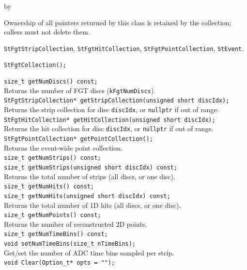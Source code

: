 \documentclass[twoside]{article}
\newcommand{\entrylabel}[1]{\mbox{\textbf{{#1}}}\hfil}%
\newenvironment{entry}
{\begin{list}{}%
    {\renewcommand{\makelabel}{\entrylabel}%
     \setlength{\labelwidth}{90pt}%
     \setlength{\leftmargin}{\labelwidth}
     \advance\leftmargin by \labelsep%
      }%
    }%
  {\end{list}}
\newcommand{\Entrylabel}[1]%
{\raisebox{0pt}[1ex][0pt]{\makebox[\labelwidth][l]%
    {\parbox[t]{\labelwidth}{\hspace{0pt}\textbf{{#1}}}}}}
\newenvironment{Entry}%
{\renewcommand{\entrylabel}{\Entrylabel}\begin{entry}}%
  {\end{entry}}
\begin{document}
\begin{Entry}
  Ownership of all pointers returned by this class is retained by the collection; callers
  must not delete them.
\item[Related Classes]
  \texttt{StFgtStripCollection}, \texttt{StFgtHitCollection},
  \texttt{StFgtPointCollection}, \texttt{StEvent}.
\item[Public\\ Constructors]
    \verb+StFgtCollection();+\\
\item[Public Member\\ Functions]
    \verb+size_t getNumDiscs() const;+\\
    Returns the number of FGT discs (\texttt{kFgtNumDiscs}).\\[2pt]
    \verb+StFgtStripCollection* getStripCollection(unsigned short discIdx);+\\
    Returns the strip collection for disc \texttt{discIdx}, or \texttt{nullptr} if out of range.\\[2pt]
    \verb+StFgtHitCollection* getHitCollection(unsigned short discIdx);+\\
    Returns the hit collection for disc \texttt{discIdx}, or \texttt{nullptr} if out of range.\\[2pt]
    \verb+StFgtPointCollection* getPointCollection();+\\
    Returns the event-wide point collection.\\[2pt]
    \verb+size_t getNumStrips() const;+\\
    \verb+size_t getNumStrips(unsigned short discIdx) const;+\\
    Returns the total number of strips (all discs, or one disc).\\[2pt]
    \verb+size_t getNumHits() const;+\\
    \verb+size_t getNumHits(unsigned short discIdx) const;+\\
    Returns the total number of 1D hits (all discs, or one disc).\\[2pt]
    \verb+size_t getNumPoints() const;+\\
    Returns the number of reconstructed 2D points.\\[2pt]
    \verb+size_t getNumTimeBins() const;+\\
    \verb+void setNumTimeBins(size_t nTimeBins);+\\
    Get/set the number of ADC time bins sampled per strip.\\[2pt]
    \verb+void Clear(Option_t* opts = "");+\\
\end{Entry}
\clearpage
\end{document}
